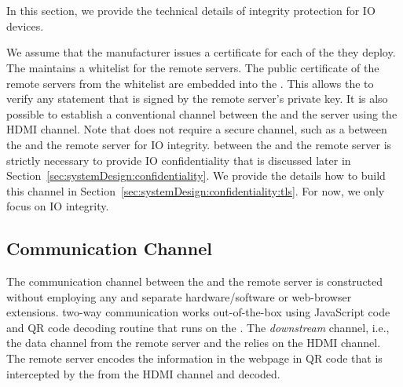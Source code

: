 \section{\name}
\label{sec:systemDesign}


In this section, we provide the technical details of \name integrity protection for IO devices. 


 We assume that the \device manufacturer issues a certificate for each of the \device they deploy. The \device maintains a whitelist for the remote servers. The public certificate of the remote servers from the whitelist are embedded into the \device. This allows the \device to verify any statement that is signed by the remote server's private key. It is also possible to establish a conventional \tls channel between the \device and the server using the HDMI channel. Note that \name does not require a secure channel, such as a \tls between the \device and the remote server for IO integrity. \tls between the \device and the remote server is strictly necessary to provide IO confidentiality that is discussed later in Section~\ref{sec:systemDesign:confidentiality}. We provide the details how to build this \tls channel in Section~\ref{sec:systemDesign:confidentiality:tls}. For now, we only focus on IO integrity.




\iffalse
\subsection{Communication Channel}
\label{sec:systemDesign:communicationChannel}

The communication channel between the \device and the remote server is constructed without employing any and separate hardware/software or web-browser extensions. \name two-way communication works out-of-the-box using JavaScript code and QR code decoding routine that runs on the \device. The \emph{downstream} channel, i.e., the data channel from the remote server and the \device relies on the HDMI channel. The remote server encodes the information in the webpage in QR code that is intercepted by the \device from the HDMI channel and decoded.

